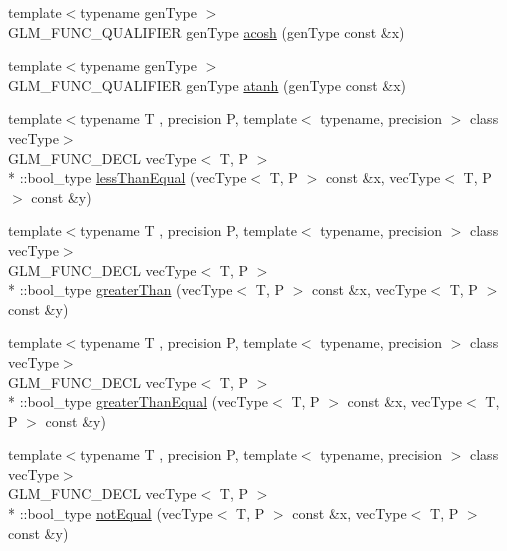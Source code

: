 \begin{DoxyCompactItemize}
\item 
{\footnotesize template$<$typename gen\-Type $>$ }\\G\-L\-M\-\_\-\-F\-U\-N\-C\-\_\-\-Q\-U\-A\-L\-I\-F\-I\-E\-R gen\-Type \hyperlink{group__core__func__trigonometric_ga961d72b4a20d09d6e71fdf076ad4f433}{acosh} (gen\-Type const \&x)
\item 
{\footnotesize template$<$typename gen\-Type $>$ }\\G\-L\-M\-\_\-\-F\-U\-N\-C\-\_\-\-Q\-U\-A\-L\-I\-F\-I\-E\-R gen\-Type \hyperlink{group__core__func__trigonometric_gaa20b78cb9c12e30bd5a3054b8cb3d099}{atanh} (gen\-Type const \&x)
\item 
{\footnotesize template$<$typename T , precision P, template$<$ typename, precision $>$ class vec\-Type$>$ }\\G\-L\-M\-\_\-\-F\-U\-N\-C\-\_\-\-D\-E\-C\-L vec\-Type$<$ T, P $>$\\*
\-::bool\-\_\-type \hyperlink{group__core__func__vector__relational_ga2167b22ac086c5791a4740932b62b685}{less\-Than\-Equal} (vec\-Type$<$ T, P $>$ const \&x, vec\-Type$<$ T, P $>$ const \&y)
\item 
{\footnotesize template$<$typename T , precision P, template$<$ typename, precision $>$ class vec\-Type$>$ }\\G\-L\-M\-\_\-\-F\-U\-N\-C\-\_\-\-D\-E\-C\-L vec\-Type$<$ T, P $>$\\*
\-::bool\-\_\-type \hyperlink{group__core__func__vector__relational_gac9163d451231eb3eaae2c6b3da5add6a}{greater\-Than} (vec\-Type$<$ T, P $>$ const \&x, vec\-Type$<$ T, P $>$ const \&y)
\item 
{\footnotesize template$<$typename T , precision P, template$<$ typename, precision $>$ class vec\-Type$>$ }\\G\-L\-M\-\_\-\-F\-U\-N\-C\-\_\-\-D\-E\-C\-L vec\-Type$<$ T, P $>$\\*
\-::bool\-\_\-type \hyperlink{group__core__func__vector__relational_gad1385064aa2fc7aaae37aa95daea9c31}{greater\-Than\-Equal} (vec\-Type$<$ T, P $>$ const \&x, vec\-Type$<$ T, P $>$ const \&y)
\item 
{\footnotesize template$<$typename T , precision P, template$<$ typename, precision $>$ class vec\-Type$>$ }\\G\-L\-M\-\_\-\-F\-U\-N\-C\-\_\-\-D\-E\-C\-L vec\-Type$<$ T, P $>$\\*
\-::bool\-\_\-type \hyperlink{group__core__func__vector__relational_ga85d7bc5613c4dcc2d5873ec9d6ed4c19}{not\-Equal} (vec\-Type$<$ T, P $>$ const \&x, vec\-Type$<$ T, P $>$ const \&y)

\end{DoxyCompactItemize}
